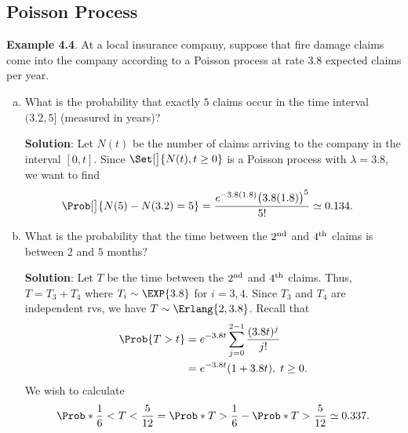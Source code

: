 \subsection*{Poisson Process}
\begin{Example}
    \textbf{Example 4.4}. At a local insurance company, suppose that fire damage claims come into the
    company according to a Poisson process at rate $3.8$ expected claims per year.
    \begin{enumerate}[(a)]
        \item What is the probability that exactly $5$ claims occur in the time interval $(3.2, 5]$ (measured
              in years)?

              \textbf{Solution}: Let $ N(t) $ be the number of claims arriving
              to the company in the interval $ [0,t] $. Since $ \Set[\big]{N(t),t\ge 0} $
              is a Poisson process with $ \lambda=3.8 $, we want to find
              \begin{align*}
                  \Prob[\big]{N(5)-N(3.2)=5}
                   & =\frac{e^{-3.8(1.8)}\bigl(3.8(1.8)\bigr)^5}{5!}\simeq 0.134.
              \end{align*}
        \item What is the probability that the time between the $2\textsuperscript{nd}$ and $4\textsuperscript{th}$ claims is between $2$ and $5$
              months?

              \textbf{Solution}: Let $ T $ be the time between
              the $2\textsuperscript{nd}$ and $4\textsuperscript{th}$ claims. Thus,
              $ T=T_3+T_4 $ where $ T_i \sim \EXP{3.8} $ for $ i=3,4 $. Since $ T_3 $
              and $ T_4 $ are independent rvs, we have $ T \sim \Erlang{2,3.8} $.
              Recall that
              \begin{align*}
                  \Prob{T>t}
                   & =e^{-3.8 t}\sum_{j=0}^{2-1}\frac{(3.8 t)^j}{j!} \\
                   & =e^{-3.8 t}(1+3.8t),\; t\ge 0.
              \end{align*}
              We wish to calculate
              \[\Prob*{\frac{1}{6}<T<\frac{5}{12}}
                  =\Prob*{T>\frac{1}{6}}-\Prob*{T>\frac{5}{12}}\simeq 0.337.\]
    \end{enumerate}
\end{Example}